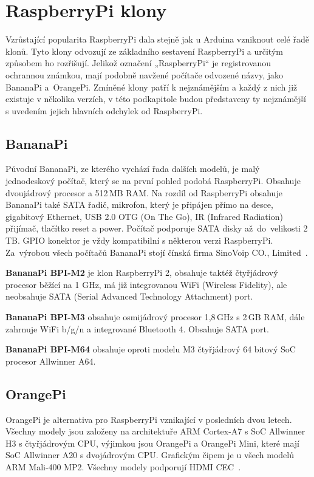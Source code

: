 \section{RaspberryPi klony}
\label{KapRaspiKlony}

Vzrůstající popularita RaspberryPi dala stejně jak u Arduina vzniknout celé řadě klonů. Tyto klony odvozují ze základního sestavení RaspberryPi a určitým způsobem ho rozřišují. Jelikož označení „RaspberryPi“ je registrovanou ochrannou známkou, mají podobně navžené počítače odvozené názvy, jako BananaPi a~OrangePi. Zmíněné klony patří k nejznámějším a každý z nich již existuje v několika verzích, v této podkapitole budou představeny ty nejznámější s uvedením jejich hlavních odchylek od RaspberryPi.

	\subsection{BananaPi}
		Původní BananaPi, ze kterého vychází řada dalších modelů, je malý jednodeskový počítač, který se na první pohled podobá RaspberryPi.  Obsahuje dvoujádrový procesor a 512\,MB RAM. Na rozdíl od RaspberryPi obsahuje BananaPi také SATA řadič, mikrofon, který je připájen přímo na desce, gigabitový Ethernet, USB 2.0 OTG (On The Go), IR (Infrared Radiation) přijímač, tlačítko reset a power. Počítač podporuje SATA disky až~do~velikosti 2\,TB. GPIO konektor je vždy kompatibilní s některou verzi RaspberryPi. Za~výrobou všech počítačů BananaPi stojí čínská firma SinoVoip CO., Limited~\cite{BananaPi}.
		
	\textbf{BananaPi BPI-M2} je klon RaspberryPi 2, obsahuje taktéž čtyřjádrový procesor běžící na 1 GHz, má již integrovanou WiFi (Wireless Fidelity), ale neobsahuje SATA (Serial Advanced Technology Attachment) port.
	
	\textbf{BananaPi BPI-M3} obsahuje osmijádrový procesor 1,8\,GHz s 2\,GB RAM, dále zahrnuje WiFi b/g/n a integrované Bluetooth 4. Obsahuje SATA port.
	
	\textbf{BananaPi BPI-M64} obsahuje oproti modelu M3 čtyřjádrový 64 bitový SoC procesor Allwinner A64.
	
	\subsection{OrangePi}
	OrangePi je alternativa pro RaspberryPi vznikající v posledních dvou letech. Všechny modely jsou založeny na architektuře ARM Cortex-A7 s SoC Allwinner H3 s čtyřjádrovým CPU, výjimkou jsou OrangePi a OrangePi Mini, které mají SoC Allwinner A20 s dvojádrovým CPU. Grafickým čipem je u všech modelů ARM Mali-400 MP2. Všechny modely podporují HDMI CEC~\cite{OrangePi}.

